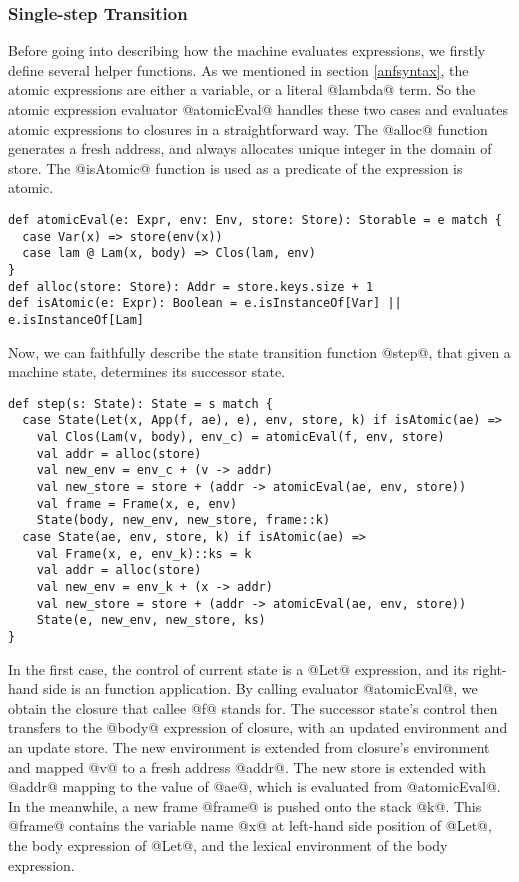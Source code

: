 \documentclass[acmsmall,review,anonymous]{acmart}\settopmatter{printfolios=true,printccs=false,printacmref=false}
\begin{document}
\subsubsection{Single-step Transition}
Before going into describing how the machine evaluates expressions, we firstly define several helper functions.
As we mentioned in section \ref{anfsyntax}, the atomic expressions are either a variable, or
a literal @lambda@ term. So the atomic expression evaluator @atomicEval@ handles these two
cases and evaluates atomic expressions to closures in a straightforward way.
The @alloc@ function generates a fresh address, and always allocates unique integer 
in the domain of store.
The @isAtomic@ function is used as a predicate of the expression is atomic.

\begin{lstlisting}
def atomicEval(e: Expr, env: Env, store: Store): Storable = e match {
  case Var(x) => store(env(x))
  case lam @ Lam(x, body) => Clos(lam, env)
}
def alloc(store: Store): Addr = store.keys.size + 1
def isAtomic(e: Expr): Boolean = e.isInstanceOf[Var] || e.isInstanceOf[Lam]
\end{lstlisting}

Now, we can faithfully describe the state transition function @step@,
that given a machine state, determines its successor state.

\begin{lstlisting}
def step(s: State): State = s match {
  case State(Let(x, App(f, ae), e), env, store, k) if isAtomic(ae) =>
    val Clos(Lam(v, body), env_c) = atomicEval(f, env, store)
    val addr = alloc(store)
    val new_env = env_c + (v -> addr)
    val new_store = store + (addr -> atomicEval(ae, env, store))
    val frame = Frame(x, e, env)
    State(body, new_env, new_store, frame::k)
  case State(ae, env, store, k) if isAtomic(ae) =>
    val Frame(x, e, env_k)::ks = k
    val addr = alloc(store)
    val new_env = env_k + (x -> addr)
    val new_store = store + (addr -> atomicEval(ae, env, store))
    State(e, new_env, new_store, ks)
}
\end{lstlisting}

In the first case, the control of current state is a @Let@ expression,
and its right-hand side is an function application.
By calling evaluator @atomicEval@, we obtain the closure that callee @f@ stands for.
The successor state's control then transfers to the @body@ expression of closure,
with an updated environment and an update store. The new environment is extended
from closure's environment and mapped @v@ to a fresh address @addr@.
The new store is extended with @addr@ mapping to the value of @ae@,
which is evaluated from @atomicEval@.
In the meanwhile, a new frame @frame@ is pushed onto the stack @k@.
This @frame@ contains the variable name @x@ at left-hand side position of @Let@,
the body expression of @Let@, and the lexical environment of the body expression.
\end{document}
